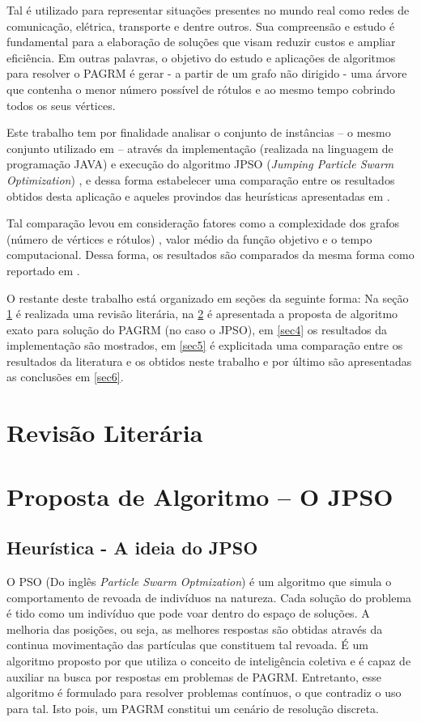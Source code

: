 \documentclass{sig-alternate-05-2015}
\begin{document}
Tal é utilizado para representar situações presentes no mundo real como redes de comunicação, elétrica, transporte e dentre outros. Sua compreensão e estudo é fundamental para a elaboração de soluções que visam reduzir custos e ampliar eficiência. Em outras palavras, o objetivo do estudo e aplicações de algoritmos para resolver o PAGRM é gerar - a partir de um grafo não dirigido - uma árvore que contenha o menor número possível de rótulos e ao mesmo tempo cobrindo todos os seus vértices.

Este trabalho tem por finalidade analisar o conjunto de instâncias  -- o mesmo conjunto utilizado em \cite{} -- através da implementação (realizada na linguagem de programação JAVA) e execução do algoritmo JPSO (\textit{Jumping Particle Swarm Optimization}) \cite{}, e dessa forma estabelecer uma comparação entre os resultados obtidos desta aplicação e aqueles provindos das heurísticas apresentadas em \cite{}. 

Tal comparação levou em consideração fatores como a complexidade dos grafos (número de vértices e rótulos) , valor médio da função objetivo e o tempo computacional. Dessa forma, os resultados são comparados da mesma forma como reportado em \cite{}.

O restante deste trabalho está organizado em seções da seguinte forma: Na seção \ref{sec2} é realizada uma revisão literária, na \ref{sec3} é apresentada a proposta de algoritmo exato para solução do PAGRM (no caso o JPSO), em \ref{sec4} os resultados da implementação são mostrados, em \ref{sec5} é explicitada uma comparação entre os resultados da literatura e os obtidos neste trabalho e por último são apresentadas as conclusões em \ref{sec6}.



\section{Revisão Literária} \label{sec2}


\section{Proposta de Algoritmo -- O JPSO} \label{sec3}

\subsection{Heurística - A ideia do JPSO}

O PSO (Do inglês \textit{Particle Swarm Optmization}) é um algoritmo que simula o comportamento de revoada de indivíduos na natureza. Cada solução do problema  é tido como um indivíduo que pode voar dentro do espaço de soluções. A melhoria das posições, ou seja, as melhores respostas são obtidas através da continua movimentação das partículas que constituem tal revoada. É um algoritmo proposto por \cite{} que utiliza o conceito de inteligência coletiva e é capaz de auxiliar na busca por respostas em problemas de PAGRM. Entretanto, esse algoritmo é formulado para resolver problemas contínuos, o que contradiz o uso para tal. Isto pois, um PAGRM constitui um cenário de resolução discreta.
\end{document}
